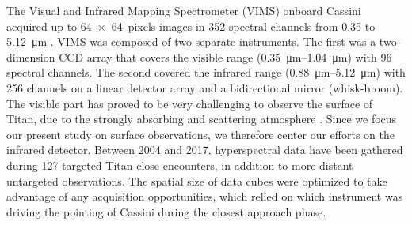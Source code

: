 \documentclass[preprint,twocolumn,5p,authoryear,compress,colorlinks=true]{elsarticle}
\begin{document}
The Visual and Infrared Mapping Spectrometer (VIMS) onboard Cassini acquired up to \SI{64x64}{pixels} images in 352 spectral channels from \num{0.35} to \SI{5.12}{\um} \citep{Brown2004}.
VIMS was composed of two separate instruments.
The first was a two-dimension CCD array that covers the visible range (\SIrange{0.35}{1.04}{\um}) with 96 spectral channels.
The second covered the infrared range (\SIrange{0.88}{5.12}{\um}) with 256 channels on a linear detector array and a bidirectional mirror (whisk-broom).
The visible part has proved to be very challenging to observe the surface of Titan, due to the strongly absorbing and scattering atmosphere \citep{Tomasko2005,Hirtzig2009,Vixie2012}.
Since we focus our present study on surface observations, we therefore center our efforts on the infrared detector. Between 2004 and 2017, hyperspectral data have been gathered during 127 targeted Titan close encounters, in addition to more distant untargeted observations.
The spatial size of data cubes were optimized to take advantage of any acquisition opportunities, which relied on which instrument was driving the pointing of Cassini during the closest approach phase.
\end{document}
